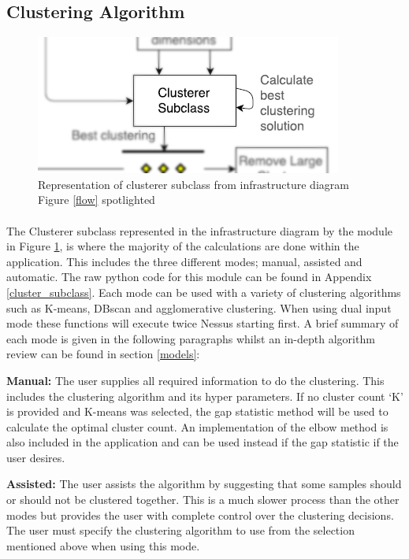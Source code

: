 \subsection{Clustering Algorithm}
\label{infra4}

\begin{figure}[!h]
\centering
\includegraphics{./Figures/clustersubclass.png}
\caption{Representation of clusterer subclass from infrastructure diagram Figure \ref{flow} spotlighted}
\label{clustersub}
\end{figure}

\paragraph{}The Clusterer subclass represented in the infrastructure diagram by the module in Figure \ref{clustersub}, is where the majority of the calculations are done within the application. This includes the three different modes; manual, assisted and automatic. The raw python code for this module can be found in Appendix \ref{cluster_subclass}. Each mode can be used with a variety of clustering algorithms such as K-means, DBscan and agglomerative clustering. When using dual input mode these functions will execute twice Nessus starting first. A brief summary of each mode is given in the following paragraphs whilst an in-depth algorithm review can be found in section \ref{models}:

    \textbf{Manual:}
     The user supplies all required information to do the clustering. This includes the clustering algorithm and its hyper parameters. If no cluster count ‘K' is provided and K-means was selected, the gap statistic method will be used to calculate the optimal cluster count. An implementation of the elbow method is also included in the application and can be used instead if the gap statistic if the user desires.

    \textbf{Assisted:}
     The user assists the algorithm by suggesting that some samples should or should not be clustered together. This is a much slower process than the other modes but provides the user with complete control over the clustering decisions. The user must specify the clustering algorithm to use from the selection mentioned above when using this mode.

